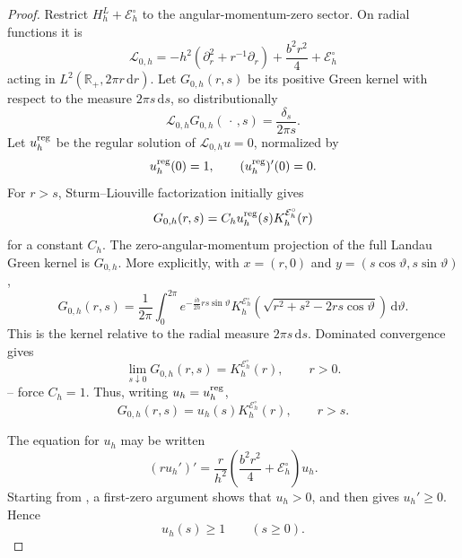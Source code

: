 \documentclass[11pt]{article}
\newcommand{\R}{\mathbb R}
\newcommand{\dd}{\,\mathrm d}
\newcommand{\cE}{\mathcal E}
\begin{document}
\begin{proof}
Restrict $H_h^L+\cE_h^\circ$ to the angular-momentum-zero sector.  On radial
functions it is
\begin{equation}\label{eq:radial-free-operator}
 \mathscr L_{0,h}
 =-h^2\left(\partial_r^2+r^{-1}\partial_r\right)
 +\frac{b^2r^2}{4}+\cE_h^\circ
\end{equation}
acting in $L^2(\R_+,2\pi r\dd r)$.  Let $G_{0,h}(r,s)$ be its positive
Green kernel with respect to the measure $2\pi s\dd s$, so distributionally
\begin{equation}\label{eq:radial-green-delta}
 \mathscr L_{0,h}G_{0,h}(\,\cdot\,,s)
 =\frac{\delta_s}{2\pi s}.
\end{equation}
Let $u_h^{\rm reg}$ be the regular solution of
$\mathscr L_{0,h}u=0$, normalized by
\begin{equation}\label{eq:u-normalization}
 u_h^{\rm reg}(0)=1,
 \qquad (u_h^{\rm reg})'(0)=0.
\end{equation}
For $r>s$, Sturm--Liouville factorization initially gives
\begin{equation}\label{eq:radial-G-factor-pre}
 G_{0,h}(r,s)=C_hu_h^{\rm reg}(s)K_h^{\cE_h^\circ}(r)
\end{equation}
for a constant $C_h$.  The zero-angular-momentum projection of the full Landau Green kernel is
$G_{0,h}$.  More explicitly, with $x=(r,0)$ and
$y=(s\cos\vartheta,s\sin\vartheta)$,
\begin{equation}\label{eq:radial-green-angular-average}
 G_{0,h}(r,s)=\frac1{2\pi}\int_0^{2\pi}
 e^{-\frac{ib}{2h}rs\sin\vartheta}
 K_h^{\cE_h^\circ}
 \!\left(\sqrt{r^2+s^2-2rs\cos\vartheta}\right)\dd\vartheta.
\end{equation}
This is the kernel relative to the radial measure $2\pi s\dd s$.  Dominated
convergence gives
\begin{equation}\label{eq:radial-green-origin-limit}
 \lim_{s\downarrow0}G_{0,h}(r,s)=K_h^{\cE_h^\circ}(r),
 \qquad r>0.
\end{equation}
--
force $C_h=1$.  Thus, writing $u_h=u_h^{\rm reg}$,
\begin{equation}\label{eq:radial-G-factor}
 G_{0,h}(r,s)=u_h(s)K_h^{\cE_h^\circ}(r),
 \qquad r>s.
\end{equation}

The equation for $u_h$ may be written
\begin{equation}\label{eq:u-monotone}
 (ru_h')'
 =\frac r{h^2}\left(\frac{b^2r^2}{4}+\cE_h^\circ\right)u_h.
\end{equation}
Starting from , a first-zero argument shows that
$u_h>0$, and then  gives $u_h'\ge0$.  Hence
\begin{equation}\label{eq:u-lower}
 u_h(s)\ge1
 \qquad(s\ge0).
\end{equation}


\end{proof}
\end{document}
